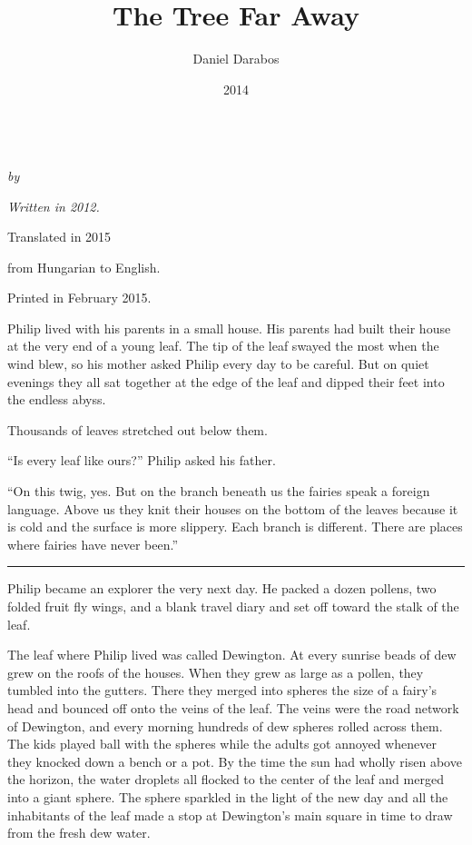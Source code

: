 \documentclass[10pt]{memoir}
\author{Daniel Darabos}
\date{2014}
\title{The Tree Far Away}
\renewcommand{\pfbreakdisplay}{\bigskip \ding{166} \bigskip}
\newcommand{\secbreak}{\fancybreak{\pfbreakdisplay}}
\begin{document}
\begin{titlingpage}
  \centering
  \vspace*{0.2\textheight}
  {\Huge \thetitle}\\[\baselineskip]
  {\large\itshape by \theauthor}\\[\baselineskip]
  \vfill
  {\itshape Written in 2012. \par
  Translated in 2015 \par from Hungarian to English. \par
  Printed in February 2015.}
  \vspace*{0.1\textheight}
\end{titlingpage}

\vspace*{0.4\textheight}
\noindent
Philip lived with his parents in a small house. His parents had built their
house at the very end of a young leaf. The tip of the leaf swayed the most when
the wind blew, so his mother asked Philip every day to be careful. But on quiet
evenings they all sat together at the edge of the leaf and dipped their feet
into the endless abyss.

Thousands of leaves stretched out below them.

``Is every leaf like ours?'' Philip asked his father.

``On this twig, yes. But on the branch beneath us the fairies speak a foreign
language. Above us they knit their houses on the bottom of the leaves because
it is cold and the surface is more slippery. Each branch is different. There
are places where fairies have never been.''

\secbreak

Philip became an explorer the very next day. He packed a dozen pollens, two
folded fruit fly wings, and a blank travel diary and set off toward the stalk of
the leaf.

The leaf where Philip lived was called Dewington. At every sunrise beads of dew
grew on the roofs of the houses. When they grew as large as a pollen, they
tumbled into the gutters. There they merged into spheres the size of a fairy's
head and bounced off onto the veins of the leaf. The veins were the road
network of Dewington, and every morning hundreds of dew spheres rolled across
them. The kids played ball with the spheres while the adults got annoyed
whenever they knocked down a bench or a pot. By the time the sun had wholly
risen above the horizon, the water droplets all flocked to the center of the
leaf and merged into a giant sphere. The sphere sparkled in the light of the
new day and all the inhabitants of the leaf made a stop at Dewington's main
square in time to draw from the fresh dew water.
\end{document}

